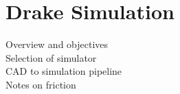 \chapter{Drake Simulation}

Overview and objectives\\
Selection of simulator\\
CAD to simulation pipeline\\
Notes on friction\\
